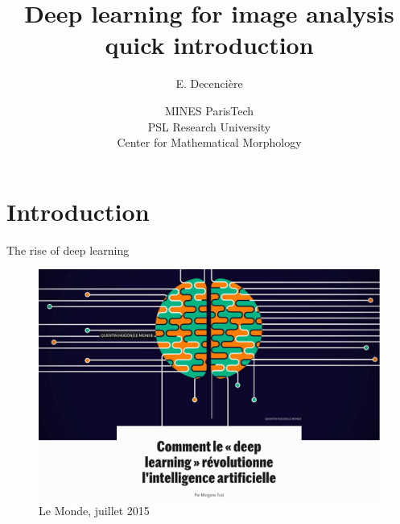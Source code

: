 \documentclass[xcolor=pdftex,dvipsnames,table,mathserif]{beamer}
\title{Deep learning for image analysis quick introduction}
\author{E. Decencière}
\date{MINES ParisTech\\
  PSL Research University\\
  Center for Mathematical Morphology
}
\begin{document}
\frame{\titlepage}


\section{Introduction}

\begin{frame}{The rise of deep learning}

\begin{figure}[ht]
  \centering
  \includegraphics[height=0.5\textheight]{lemonde-juillet2015}
  \caption*{Le Monde, juillet 2015}
\end{figure}


\end{frame}
\end{document}
